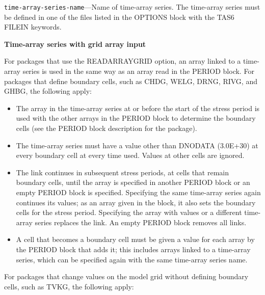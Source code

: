 \begin{description}
\item \texttt{time-array-series-name}---Name of time-array series. The time-array series must be defined in one of the files listed in the OPTIONS block with the TAS6 FILEIN keywords.
\end{description}

\vspace{5 mm}

\noindent \textbf{Time-array series with grid array input}

For packages that use the READARRAYGRID option, an array linked to a time-array series is used in the same way as an array read in the PERIOD block.  For packages that define boundary cells, such as CHDG, WELG, DRNG, RIVG, and GHBG, the following apply:

\begin{itemize}
\item The array in the time-array series at or before the start of the stress period is used with the other arrays in the PERIOD block to determine the boundary cells (see the PERIOD block description for the package).
\item The time-array series must have a value other than DNODATA (3.0E+30) at every boundary cell at every time used. Values at other cells are ignored.
\item The link continues in subsequent stress periods, at cells that remain boundary cells, until the array is specified in another PERIOD block or an empty PERIOD block is specified. Specifying the same time-array series again continues its values; as an array given in the block, it also sets the boundary cells for the stress period. Specifying the array with values or a different time-array series replaces the link. An empty PERIOD block removes all links.
\item A cell that becomes a boundary cell must be given a value for each array by the PERIOD block that adds it; this includes arrays linked to a time-array series, which can be specified again with the same time-array series name.
\end{itemize}

For packages that change values on the model grid without defining boundary cells, such as TVKG, the following apply:


